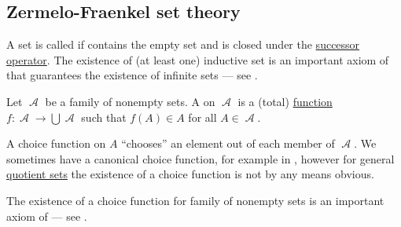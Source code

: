 \subsection{Zermelo-Fraenkel set theory}\label{subsec:zermelo_fraenkel_set_theory}

\begin{definition}\label{def:inductive_set}
  A set is called  if contains the empty set and is closed under the \hyperref[def:basic_set_operations/successor]{successor operator}. The existence of (at least one) inductive set is an important axiom of  that guarantees the existence of infinite sets --- see .
\end{definition}

\begin{definition}\label{def:choice_function}
  Let \( \mscrA \) be a family of nonempty sets. A  on \( \mscrA \) is a (total) \hyperref[def:function]{function} \( f: \mscrA \to \bigcup \mscrA \) such that \( f(A) \in A \) for all \( A \in \mscrA \).

  A choice function on \( A \) \enquote{chooses} an element out of each member of \( \mscrA \). We sometimes have a canonical choice function, for example in , however for general \hyperref[def:equivalence_relation/quotient]{quotient sets} the existence of a choice function is not by any means obvious.

  The existence of a choice function for family of nonempty sets is an important axiom of  --- see .
\end{definition}

